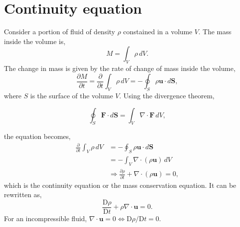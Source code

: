 \section{Continuity equation}
Consider a portion of fluid of density $\rho$ constained in a volume $V$. The mass inside the volume is, 
\begin{equation}
  M = \int_V \rho\,dV. 
\end{equation} 
The change in mass is given by the rate of change of mass inside the volume,
\begin{equation}
  \frac{\partial M}{\partial t} = \frac{\partial}{\partial t}\int_V \rho\,dV = -\oint_S \rho\mathbf{u}\cdot d\mathbf{S},
\end{equation} 
where $S$ is the surface of the volume $V$. Using the divergence theorem, 
\begin{theorem}
\begin{equation}
  \oint_S \mathbf{F}\cdot d\mathbf{S} = \int_V \nabla\cdot\mathbf{F}\,dV, 
\end{equation}
\vspace{-0.5cm}
\end{theorem}
the equation becomes, 
\begin{equation}
  \begin{aligned}
    \frac{\partial}{\partial t}\int_V \rho\,dV &= -\oint_S \rho\mathbf{u}\cdot d\mathbf{S}\\
                                  &= -\int_V \nabla\cdot(\rho\mathbf{u})\,dV\\
                                  &\Rightarrow \frac{\partial \rho}{\partial t} + \nabla\cdot(\rho\mathbf{u}) = 0,
  \end{aligned}
\end{equation}
which is the \textsf{continuity equation} or the \textsf{mass conservation equation}. It can be rewritten as, 
\begin{equation}
  \frac{\text{D}\rho}{\text{D}t} + \rho\nabla\cdot\mathbf{u} = 0. 
\end{equation}
For an \textsf{incompressible fluid}, $\nabla\cdot\mathbf{u} = 0 \Leftrightarrow \text{D}\rho/\text{D}t = 0$.

